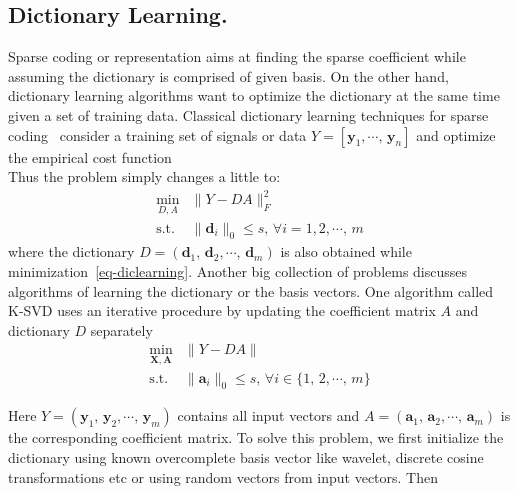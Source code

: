 \subsection{Dictionary Learning.}
Sparse coding or representation aims at finding the sparse coefficient while assuming the dictionary is comprised of given basis.
On the other hand, dictionary learning algorithms want to optimize the dictionary at the same time given a set of training data.
Classical dictionary learning techniques for sparse coding~\cite{olshausen1997sparse,engan1999frame,elad2006image} consider a training set of signals or data $Y=[\mathbf{y}_1,\cdots,\,\mathbf{y}_n]$ and optimize the empirical cost function
\begin{equation}
\end{equation}
Thus the problem simply changes a little to:
\begin{equation}
\label{eq-diclearning}
\begin{array}{cl}
\min_{D,A} & \|Y-DA\|_F^2\\
\mathrm{s.t.} & \|\mathbf{d}_i\|_0 \leq s,\,\forall i=1,2,\cdots,\,m
\end{array}
\end{equation}
where the dictionary $D=(\mathbf{d}_1,\,\mathbf{d}_2,\cdots ,\,\mathbf{d}_m)$ is also obtained while minimization~\eqref{eq-diclearning}.
Another big collection of problems discusses algorithms of learning the dictionary or the basis vectors.
One algorithm called K-SVD uses an iterative procedure by updating the coefficient matrix $A$ and dictionary $D$ separately
\begin{equation}
\begin{array}{cl}
\min_{\mathbf{X},\mathbf{A}} & \|Y-DA\| \\
\mathrm{s.t.} & \|\mathbf{a}_i\|_0 \leq s,\,\forall i\in\{1,\,2,\cdots ,\,m\}
\end{array}
\end{equation}

Here $Y=(\mathbf{y}_1,\,\mathbf{y}_2,\cdots ,\,\mathbf{y}_m)$ contains all input vectors and $A = (\mathbf{a}_1,\,\mathbf{a}_2,\cdots ,\,\mathbf{a}_m)$ is the corresponding coefficient matrix.
To solve this problem, we first initialize the dictionary using known overcomplete basis vector like wavelet, discrete cosine transformations etc or using random vectors from  input vectors.
Then

